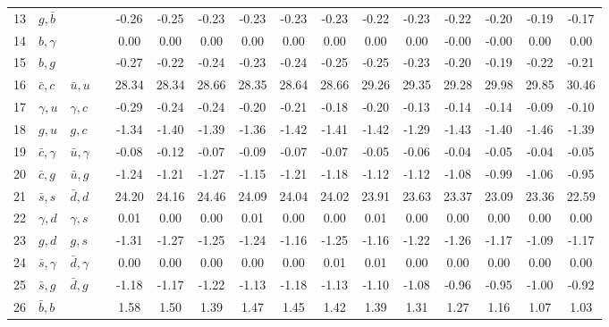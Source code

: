 \begin{tabularx}{\textwidth}{rXXX@{}S@{}S@{}S@{}S@{}S@{}S@{}S@{}S@{}S@{}S@{}S@{}S}
 13 & $g,\bar b$       &                  &                 & -0.26 & -0.25 & -0.23 & -0.23 & -0.23 & -0.23 & -0.22 & -0.23 & -0.22 & -0.20 & -0.19 & -0.17 \\
 14 & $b,\gamma$       &                  &                 &  0.00 &  0.00 &  0.00 &  0.00 &  0.00 &  0.00 &  0.00 &  0.00 & -0.00 & -0.00 &  0.00 &  0.00 \\
 15 & $b,g$            &                  &                 & -0.27 & -0.22 & -0.24 & -0.23 & -0.24 & -0.25 & -0.25 & -0.23 & -0.20 & -0.19 & -0.22 & -0.21 \\
 16 & $\bar c,c$       & $\bar u,u$       &                 & 28.34 & 28.34 & 28.66 & 28.35 & 28.64 & 28.66 & 29.26 & 29.35 & 29.28 & 29.98 & 29.85 & 30.46 \\
 17 & $\gamma, u$      & $\gamma, c$      &                 & -0.29 & -0.24 & -0.24 & -0.20 & -0.21 & -0.18 & -0.20 & -0.13 & -0.14 & -0.14 & -0.09 & -0.10 \\
 18 & $g,u$            & $g,c$            &                 & -1.34 & -1.40 & -1.39 & -1.36 & -1.42 & -1.41 & -1.42 & -1.29 & -1.43 & -1.40 & -1.46 & -1.39 \\
 19 & $\bar c,\gamma$  & $\bar u,\gamma$  &                 & -0.08 & -0.12 & -0.07 & -0.09 & -0.07 & -0.07 & -0.05 & -0.06 & -0.04 & -0.05 & -0.04 & -0.05 \\
 20 & $\bar c, g$      & $\bar u, g$      &                 & -1.24 & -1.21 & -1.27 & -1.15 & -1.21 & -1.18 & -1.12 & -1.12 & -1.08 & -0.99 & -1.06 & -0.95 \\
 21 & $\bar s, s$      & $\bar d, d$      &                 & 24.20 & 24.16 & 24.46 & 24.09 & 24.04 & 24.02 & 23.91 & 23.63 & 23.37 & 23.09 & 23.36 & 22.59 \\
 22 & $\gamma, d$      & $\gamma, s$      &                 &  0.01 &  0.00 &  0.00 &  0.01 &  0.00 &  0.00 &  0.01 &  0.00 &  0.00 &  0.00 &  0.00 &  0.00 \\
 23 & $g,d$            & $g,s$            &                 & -1.31 & -1.27 & -1.25 & -1.24 & -1.16 & -1.25 & -1.16 & -1.22 & -1.26 & -1.17 & -1.09 & -1.17 \\
 24 & $\bar s,\gamma$  & $\bar d,\gamma$  &                 &  0.00 &  0.00 &  0.00 &  0.00 &  0.00 &  0.01 &  0.01 &  0.00 &  0.00 &  0.00 &  0.00 &  0.00 \\
 25 & $\bar s,g$       & $\bar d, g$      &                 & -1.18 & -1.17 & -1.22 & -1.13 & -1.18 & -1.13 & -1.10 & -1.08 & -0.96 & -0.95 & -1.00 & -0.92 \\
 26 & $\bar b,b$       &                  &                 &  1.58 &  1.50 &  1.39 &  1.47 &  1.45 &  1.42 &  1.39 &  1.31 &  1.27 &  1.16 &  1.07 &  1.03 \\

\end{tabularx}

